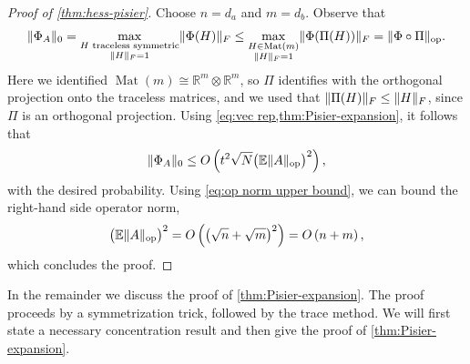 \documentclass[aos]{imsart}
\theoremstyle{definition}
\numberwithin{equation}{section}
\DeclareMathOperator{\op}{op}
\DeclareMathOperator{\Mat}{Mat}
\DeclarePairedDelimiter{\norm}{\lVert}{\rVert}
\newcommand{\R}{{\mathbb{R}}}
\newcommand{\ot}{\otimes}
\newcommand{\E}{\mathbb{E}}
\newcommand{\MW}[1]{{\color{red}[MW: #1]}}
\newcommand{\MW}[1]{{}}
\begin{document}
\begin{appendix}
\begin{proof}[Proof of \cref{thm:hess-pisier}]
Choose $n=d_a$ and $m=d_b$.
Observe that
\begin{align*}
  \norm{\Phi_A}_0
= \max_{\substack{H \text{ traceless symmetric} \\ \norm H_F=1}} \norm{\Phi(H)}_F
\leq %
\max_{\substack{H \in \Mat(m) \\ \norm H_F = 1}} \norm{\Phi(\Pi(H))}_F
= \norm{\Phi \circ \Pi}_{\op}.
\end{align*}
Here we identified $\Mat(m) \cong \R^m \ot \R^m$, so $\Pi$ identifies with the orthogonal projection onto the traceless matrices, and we used that $\norm{\Pi(H)}_F \leq \norm{H}_F$, since $\Pi$ is an orthogonal projection.
Using \cref{eq:vec rep,thm:Pisier-expansion}, it follows that
\begin{align*}
  \norm{\Phi_A}_0 \leq O\left( t^2 \sqrt{N} \bigl( \E \norm{A}_{\op} \bigr)^2 \right),
\end{align*}
with the desired probability.
Using \cref{eq:op norm upper bound}, we can bound the right-hand side operator norm,
\begin{align*}
  \bigl( \E \norm{A}_{\op} \bigr)^2
= O\left( \left( \sqrt{n} + \sqrt{m} \right)^2 \right)
= O\left(n+m\right),
\end{align*}
which concludes the proof.
\end{proof}

In the remainder we discuss the proof of \cref{thm:Pisier-expansion}.
The proof proceeds by a symmetrization trick, followed by the trace method.
We will first state a necessary concentration result and then give the proof of \cref{thm:Pisier-expansion}.


\end{appendix}
\end{document}
